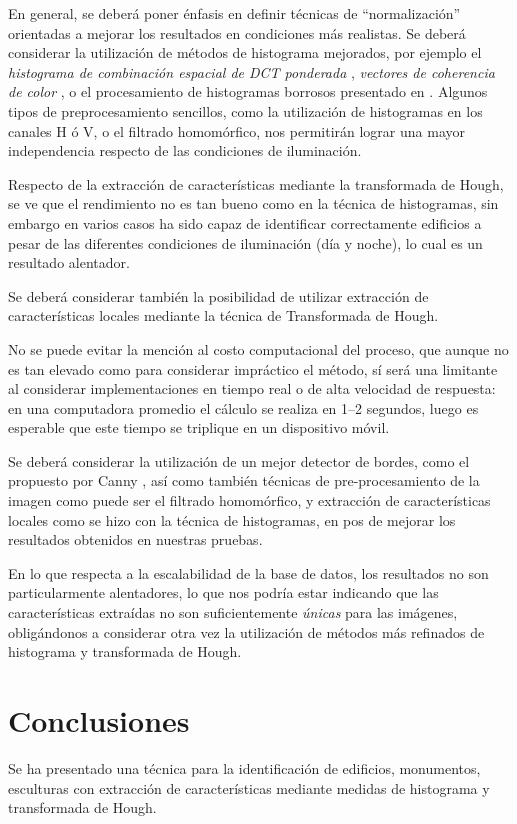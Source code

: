 \documentclass[conference,a4paper,10pt,oneside,final]{tfmpd}
\begin{document}
En general, se deberá poner énfasis en definir técnicas
de ``normalización'' orientadas a mejorar los resultados en condiciones más
realistas. Se deberá considerar la utilización de métodos de histograma
mejorados, por ejemplo el \emph{histograma de combinación espacial de DCT
ponderada} \cite{wdctsch}, \emph{vectores de coherencia de
color} \cite{Pass96histogramrefinement}, o el procesamiento de
histogramas borrosos presentado en \cite{Konstantinidis2005375}.
Algunos tipos de preprocesamiento sencillos, como la utilización de histogramas
en los canales H ó V, o el filtrado homomórfico, nos permitirán lograr una
mayor independencia respecto de las condiciones de iluminación.

Respecto de la extracción de características mediante la transformada de Hough,
se ve que el rendimiento no es tan bueno como en la técnica de histogramas,
sin embargo en varios casos ha sido capaz de identificar correctamente
e\-di\-fi\-cios a pesar de las diferentes condiciones de
iluminación (día y noche), lo cual es un resultado alentador.

Se deberá considerar también la posibilidad de utilizar extracción de
características locales mediante la técnica de Transformada de Hough.

No se puede evitar la mención al costo computacional del proceso, que aunque
no es tan elevado como para considerar impráctico el método, sí será una
limitante al considerar implementaciones en tiempo real o de alta velocidad
de respuesta: en una computadora promedio el cálculo se realiza en 1--2
segundos, luego es esperable que este tiempo se triplique en un
dispositivo móvil.

Se deberá considerar la utilización de un mejor detector de bordes, como el
propuesto por Canny \cite{canny},
así como también técnicas de pre-procesamiento de la
imagen como puede ser el filtrado homomórfico, y extracción de características
locales como se hizo con la técnica de histogramas, en pos de mejorar los
resultados obtenidos en nuestras pruebas.

En lo que respecta a la escalabilidad de la base de datos, los resultados no
son particularmente alentadores, lo que nos {podría estar
indicando que las características extraídas no son suficientemente \emph{únicas}
para las imágenes, obligándonos} a considerar otra vez la
utilización de métodos más refinados de histograma y transformada de Hough.
%
%
%
%
\section{Conclusiones}
Se ha presentado una técnica para la identificación de edificios, monumentos,
esculturas con extracción de características mediante medidas de histograma
y transformada de Hough.
\end{document}
